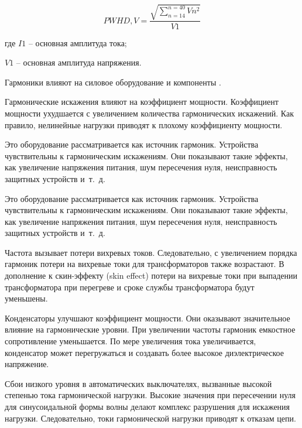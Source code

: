 \begin{equation}
	\label{eq:equation1.18}
	PWHD,V = \frac{\sqrt{\displaystyle\sum_{n=14}^{n=40} Vn^2}}{V1} 
\end{equation} 

где $I1$ – основная амплитуда тока;

$V1$ – основная амплитуда напряжения.

Гармоники влияют на силовое оборудование и компоненты \cite{soni2014review, kamenka2014six}.


Гармонические искажения влияют на коэффициент мощности. Коэффициент мощности ухудшается с увеличением количества гармонических искажений. Как правило, нелинейные нагрузки приводят к плохому коэффициенту мощности.

Это оборудование рассматривается как источник гармоник. Устройства чувствительны к гармоническим искажениям. Они показывают такие эффекты, как увеличение напряжения питания, шум пересечения нуля, неисправность защитных устройств и~т.~д.

Это оборудование рассматривается как источник гармоник. Устройства чувствительны к гармоническим искажениям. Они показывают такие эффекты, как увеличение напряжения питания, шум пересечения нуля, неисправность защитных устройств и~т.~д.

Частота вызывает потери вихревых токов. Следовательно, с увеличением порядка гармоник потери на вихревые токи для трансформаторов также возрастают. В дополнение к скин-эффекту (skin effect) потери на вихревые токи при выпадении трансформатора при перегреве и сроке службы трансформатора будут уменьшены.

Конденсаторы улучшают коэффициент мощности. Они оказывают значительное влияние на гармонические уровни. При увеличении частоты гармоник емкостное сопротивление уменьшается. По мере увеличения тока увеличивается, конденсатор может перегружаться и создавать более высокое диэлектрическое напряжение.

Сбои низкого уровня в автоматических выключателях, вызванные высокой степенью тока гармонической нагрузки. Высокие значения при пересечении нуля для синусоидальной формы волны делают комплекс разрушения для искажения нагрузки. Следовательно, токи гармонической нагрузки приводят к отказам цепи.

